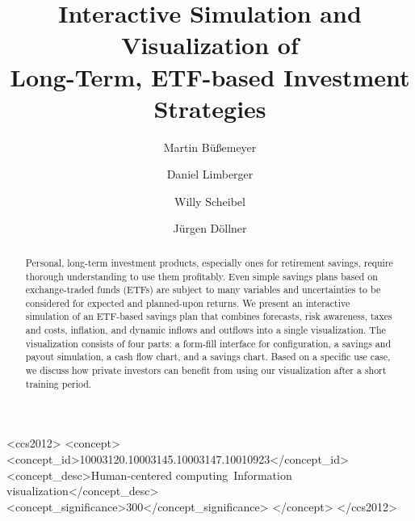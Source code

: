 \documentclass[sigconf%
,natbib=true%
]{acmart}
\begin{document}
\title[Interactive Simulation and Visualization of Long-Term, ETF-based Investment Strategies]{Interactive Simulation and Visualization of\texorpdfstring{\\}{ }Long-Term, ETF-based Investment Strategies}

\author{Martin B{\"u}{\ss}emeyer}
\author{Daniel Limberger}
\author{Willy Scheibel}
\author{J{\"u}rgen D{\"o}llner}

\renewcommand{\shortauthors}{M.~B{\"u}{\ss}emeyer, D.~Limberger, W.~Scheibel, J.~D{\"o}llner}

\begin{abstract}
    Personal, long-term investment products, especially ones for retirement savings, require thorough understanding to use them profitably.
    Even simple savings plans based on exchange-traded funds (ETFs) are subject to many variables and uncertainties to be considered for expected and planned-upon returns.
    We present an interactive simulation of an ETF-based savings plan that combines forecasts, risk awareness, taxes and costs, inflation, and dynamic inflows and outflows into a single visualization.
    The visualization consists of four parts: 
        a form-fill interface for configuration, 
        a savings and payout simulation, 
        a cash flow chart, 
        and a savings chart.
    Based on a specific use case, we discuss how private investors can benefit from using our visualization after a short training period.
\end{abstract}

\begin{CCSXML}
	<ccs2012>
	<concept>
	<concept_id>10003120.10003145.10003147.10010923</concept_id>
	<concept_desc>Human-centered computing~Information visualization</concept_desc>
	<concept_significance>300</concept_significance>
	</concept>
	</ccs2012>
\end{CCSXML}

\end{document}
